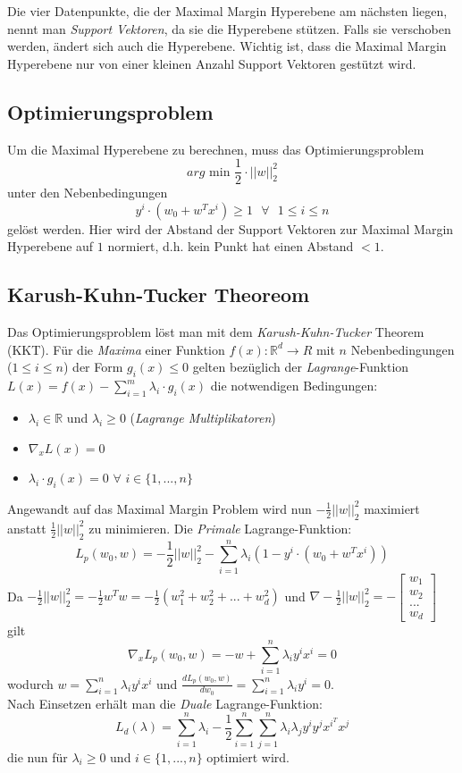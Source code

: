 \documentclass{report}
\begin{document}
Die vier Datenpunkte, die der Maximal Margin Hyperebene am nächsten liegen, nennt man \textit{Support Vektoren},
da sie die Hyperebene stützen. Falls sie verschoben werden, ändert sich auch die Hyperebene. Wichtig ist, dass die
Maximal Margin Hyperebene nur von einer kleinen Anzahl Support Vektoren gestützt wird.

\subsection{Optimierungsproblem}
Um die Maximal Hyperebene zu berechnen, muss das Optimierungsproblem
$$arg\text{ min }\frac{1}{2}\cdot ||w||_2^2$$
unter den Nebenbedingungen
$$y^i\cdot(w_0 + w^Tx^i) \geq 1\text{ }\forall\text{ }1\leq i \leq n$$
gelöst werden. Hier wird der Abstand der Support Vektoren zur Maximal Margin Hyperebene auf $1$ normiert,
d.h. kein Punkt hat einen Abstand $< 1$.\par

\subsection{Karush-Kuhn-Tucker Theoreom}

Das Optimierungsproblem löst man mit dem \textit{Karush-Kuhn-Tucker} Theorem (KKT). Für die \textit{Maxima}
einer Funktion $f(x): \mathbb{R}^d \rightarrow R$ mit $n$ Nebenbedingungen ($1\leq i \leq n$) der Form $g_i(x)\leq 0$ gelten
bezüglich der \textit{Lagrange}-Funktion $L(x) = f(x) - \sum_{i=1}^m\lambda_i\cdot g_i(x)$ die notwendigen Bedingungen:\\
\vspace*{-1.5em}
\begin{itemize}
  \item $\lambda_i\in \mathbb{R}$ und $\lambda_i \geq 0$ (\textit{Lagrange Multiplikatoren})
  \item $\nabla_xL(x) = 0$
  \item $\lambda_i\cdot g_i(x) = 0$ $\forall$ $i\in \{1, ..., n\}$
\end{itemize}

Angewandt auf das Maximal Margin Problem wird nun $-\frac{1}{2}||w||_2^2$ maximiert anstatt $\frac{1}{2}||w||_2^2$ zu minimieren.
Die \textit{Primale} Lagrange-Funktion:
$$L_p(w_0, w) = -\frac{1}{2}||w||_2^2 - \sum_{i=1}^n\lambda_i(1 - y^i\cdot(w_0 + w^Tx^i))$$
Da $-\frac{1}{2}||w||_2^2 = -\frac{1}{2}w^Tw = -\frac{1}{2}(w_1^2 + w_2^2 + ... + w_d^2)$
und $\nabla -\frac{1}{2}||w||_2^2 = -\begin{bmatrix}w_1\\w_2\\...\\w_d\end{bmatrix}$ gilt
$$\nabla_xL_p(w_0, w) = -w + \sum_{i=1}^n\lambda_iy^ix^i = 0$$
wodurch $w = \sum_{i=1}^n\lambda_iy^ix^i$ und $\frac{dL_p(w_0, w)}{dw_0} = \sum_{i=1}^n\lambda_iy^i = 0$.\\
Nach Einsetzen erhält man die \textit{Duale} Lagrange-Funktion:
$$L_d(\lambda) = \sum_{i=1}^n\lambda_i - \frac{1}{2}\sum_{i=1}^n\sum_{j=1}^n\lambda_i\lambda_jy^iy^jx^{i^T}x^j$$
die nun für $\lambda_i \geq 0$ und $i\in \{1,..., n\}$ optimiert wird.
\end{document}
